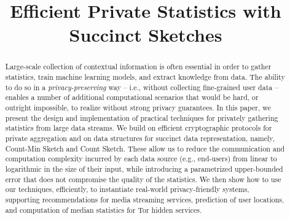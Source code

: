 \documentclass[conference]{IEEEtran}
\begin{document}
\sloppy

\title{Efficient Private Statistics with Succinct Sketches}



\author{
}


\thispagestyle{plain}



\maketitle

\begin{abstract}
Large-scale collection of contextual information is often essential in order to gather statistics, train machine learning models, and extract  knowledge from data. The ability to do so in a {\em privacy-preserving} way -- i.e., without collecting fine-grained user data -- enables a number of additional computational scenarios that would be hard, or outright impossible, to realize without strong privacy guarantees. 
In this paper, we present the design and implementation of practical techniques for privately gathering statistics from large data streams. We build on efficient cryptographic protocols for private aggregation and on data structures for succinct data representation, namely, Count-Min Sketch and Count Sketch. These allow us to reduce the communication and computation complexity incurred by each data source (e.g., end-users) from linear to logarithmic in the size of their input, while introducing a parametrized upper-bounded error that does not compromise the quality of the statistics.
We then show how to use our techniques, efficiently, to instantiate real-world privacy-friendly systems, supporting recommendations for media streaming services, prediction of user locations, and computation of median statistics for Tor hidden services. 
\end{abstract}
\end{document}

